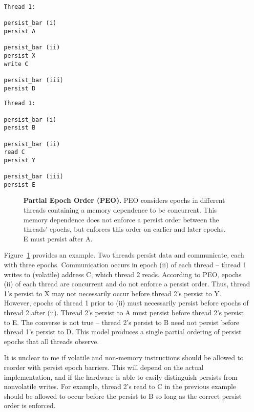 {
\singlespacing
\newsavebox{\PEOThreadOne}
\begin{lrbox}{\PEOThreadOne}
  \begin{lstlisting}
Thread 1:

persist_bar (i)
persist A

persist_bar (ii)
persist X
write C

persist_bar (iii)
persist D
  \end{lstlisting}
\end{lrbox}

\newsavebox{\PEOThreadTwo}
\begin{lrbox}{\PEOThreadTwo}
  \begin{lstlisting}
Thread 1:

persist_bar (i)
persist B

persist_bar (ii)
read C
persist Y

persist_bar (iii)
persist E
  \end{lstlisting}
\end{lrbox}

\begin{figure}[]
\centering
\subfigure{ \usebox{\PEOThreadOne} }
\hspace{1 in}
\subfigure{ \usebox{\PEOThreadTwo} }
\caption{\textbf{Partial Epoch Order (PEO).} PEO considers epochs in different threads containing a memory dependence to be concurrent.  This memory dependence does not enforce a persist order between the threads' epochs, but enforces this order on earlier and later epochs.  E must persist after A.}
\label{fig:PEO}
\end{figure}
}

Figure~\ref{fig:PEO} provides an example.
Two threads persist data and communicate, each with three epochs.
Communication occurs in epoch (ii) of each thread -- thread 1 writes to (volatile) address C, which thread 2 reads.
According to PEO, epochs (ii) of each thread are concurrent and do not enforce a persist order.
Thus, thread 1's persist to X may not necessarily occur before thread 2's persist to Y.
However, epochs of thread 1 prior to (ii) must necessarily persist before epochs of thread 2 after (ii).
Thread 2's persist to A must persist before thread 2's persist to E.
The converse is not true -- thread 2's persist to B need not persist before thread 1's persist to D.
This model produces a single partial ordering of persist epochs that all threads observe.

It is unclear to me if volatile and non-memory instructions should be allowed to reorder with persist epoch barriers.
This will depend on the actual implementation, and if the hardware is able to easily distinguish persists from nonvolatile writes.
For example, thread 2's read to C in the previous example should be allowed to occur before the persist to B so long as the correct persist order is enforced.

